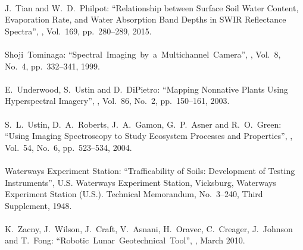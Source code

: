 \begin{mythebibliography}{}
\newpage

\leavevmode \\J.~Tian and W.~D.~Philpot:
\newblock ``Relationship between Surface Soil Water Content, Evaporation Rate, and Water Absorption Band Depths in SWIR Reflectance Spectra'',
, Vol.~169, pp.~280--289, 2015.
\\

\leavevmode \\Shoji~Tominaga:
\newblock ``Spectral~Imaging~by~a~Multichannel~Camera'',
, Vol.~8, No.~4, pp.~332--341, 1999.
\\

\leavevmode \\E.~Underwood, S.~Ustin and D.~DiPietro:
\newblock ``Mapping Nonnative Plants Using Hyperspectral Imagery'',
, Vol.~86, No.~2, pp.~150--161, 2003.
\\

\leavevmode \\S.~L.~Ustin, D.~A.~Roberts, J.~A.~Gamon, G.~P.~Asner and R.~O.~Green:
\newblock ``Using Imaging Spectroscopy to Study Ecosystem Processes and Properties'',
, Vol.~54, No.~6, pp.~523--534, 2004.
\\

\leavevmode \\Waterways Experiment Station:
\newblock ``Trafficability of Soils: Development of Testing Instruments'',
\newblock U.S. Waterways Experiment Station, Vicksburg, Waterways Experiment Station (U.S.). Technical Memorandum, No.~3--240, 
Third Supplement, 1948.
\\

\leavevmode \\K.~Zacny, J.~Wilson, J.~Craft, V.~Asnani, H.~Oravec, C.~Creager, J.~Johnson and T.~Fong:
\newblock ``Robotic~Lunar~Geotechnical~Tool'',
, March 2010.
\\


\end{mythebibliography}
